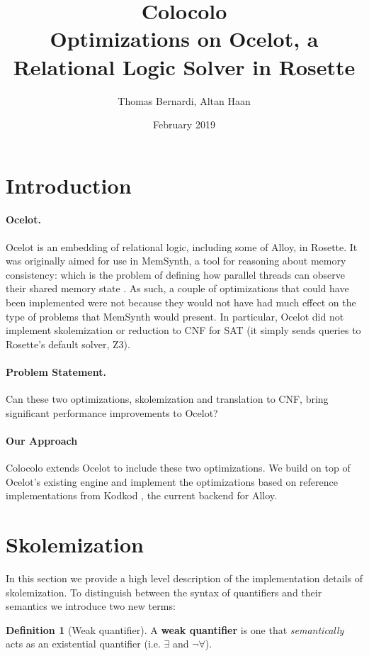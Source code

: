 \documentclass[10pt]{article}
\title{Colocolo\\\large Optimizations on Ocelot, a Relational Logic Solver in Rosette}
\date{February 2019}
\author{Thomas Bernardi, Altan Haan}
\theoremstyle{definition}
\newtheorem{definition}{Definition}[section]
\begin{document}
	\maketitle

  \section{Introduction}

  \paragraph{Ocelot.} Ocelot is an embedding of relational logic, including some of Alloy, in Rosette. It was originally aimed for use in MemSynth, a tool for reasoning about memory consistency: which is the problem of defining how parallel threads can observe their shared memory state \cite{bornholdt17}. As such, a couple of optimizations that could have been implemented were not because they would not have had much effect on the type of problems that MemSynth would present. In particular, Ocelot did not implement skolemization or reduction to CNF for SAT (it simply sends queries to Rosette's default solver, Z3).

  \paragraph{Problem Statement.} Can these two optimizations, skolemization and translation to CNF, bring significant performance improvements to Ocelot?
  
  \paragraph{Our Approach} Colocolo extends Ocelot to include these two optimizations. We build on top of Ocelot's existing engine and implement the optimizations based on reference implementations from Kodkod \cite{torlak07}, the current backend for Alloy.

  \section{Skolemization}\label{sec:skolems}
  In this section we provide a high level description of the implementation details of skolemization. To distinguish between the syntax of quantifiers and their semantics we introduce two new terms:\\
  \theoremstyle{definition}
  \begin{definition}[Weak quantifier]
      A \textbf{weak quantifier} is one that \emph{semantically} acts as an existential quantifier (i.e. $\exists$ and $\neg \forall$).
  \end{definition}
\end{document}
